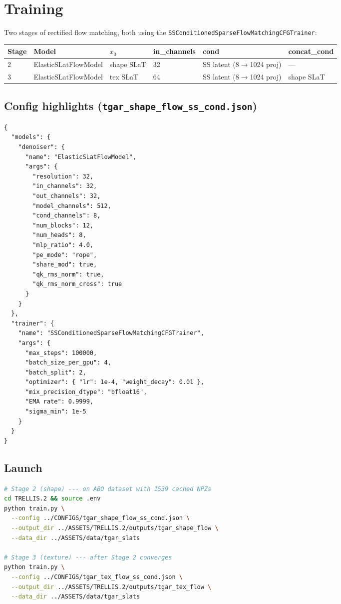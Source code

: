 \section{Training}

Two stages of rectified flow matching, both using the
\texttt{SSConditionedSparseFlowMatchingCFGTrainer}:

\begin{tabular}{llllll}
\toprule
Stage & Model & $x_0$ & in\_channels & cond & concat\_cond \\
\midrule
2 & ElasticSLatFlowModel & shape SLaT & 32 & SS latent (8$\rightarrow$1024 proj) & --- \\
3 & ElasticSLatFlowModel & tex SLaT & 64 & SS latent (8$\rightarrow$1024 proj) & shape SLaT \\
\bottomrule
\end{tabular}

\subsection{Config highlights (\texttt{tgar\_shape\_flow\_ss\_cond.json})}

\begin{lstlisting}
{
  "models": {
    "denoiser": {
      "name": "ElasticSLatFlowModel",
      "args": {
        "resolution": 32,
        "in_channels": 32,
        "out_channels": 32,
        "model_channels": 512,
        "cond_channels": 8,
        "num_blocks": 12,
        "num_heads": 8,
        "mlp_ratio": 4.0,
        "pe_mode": "rope",
        "share_mod": true,
        "qk_rms_norm": true,
        "qk_rms_norm_cross": true
      }
    }
  },
  "trainer": {
    "name": "SSConditionedSparseFlowMatchingCFGTrainer",
    "args": {
      "max_steps": 100000,
      "batch_size_per_gpu": 4,
      "batch_split": 2,
      "optimizer": { "lr": 1e-4, "weight_decay": 0.01 },
      "mix_precision_dtype": "bfloat16",
      "EMA rate": 0.9999,
      "sigma_min": 1e-5
    }
  }
}
\end{lstlisting}

\subsection{Launch}

\begin{lstlisting}[language=bash]
# Stage 2 (shape) --- on ABO dataset with 1539 cached NPZs
cd TRELLIS.2 && source .env
python train.py \
  --config ../CONFIGS/tgar_shape_flow_ss_cond.json \
  --output_dir ../ASSETS/TRELLIS.2/outputs/tgar_shape_flow \
  --data_dir ../ASSETS/data/tgar_slats

# Stage 3 (texture) --- after Stage 2 converges
python train.py \
  --config ../CONFIGS/tgar_tex_flow_ss_cond.json \
  --output_dir ../ASSETS/TRELLIS.2/outputs/tgar_tex_flow \
  --data_dir ../ASSETS/data/tgar_slats
\end{lstlisting}

